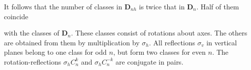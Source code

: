 It follows that the number of classes in $\boldsymbol{D}_{nh}$ is twice that in $\boldsymbol{D}_n$.
Half of them coincide

with the classes of $\boldsymbol{D}_n$.
These classes consist of rotations about axes.
The others are obtained from them by multiplication by $\sigma_h$.
All reflections $\sigma_v$ in vertical planes belong to one class for odd $n$, but form two classes for even $n$.
The rotation-reflections $\sigma_hC_n^k$ and $\sigma_hC_n^{-k}$ are conjugate in pairs.
